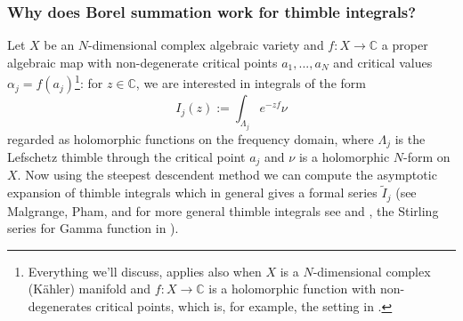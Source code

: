 \documentclass{article}
\theoremstyle{definition}
\newcommand{\C}{\mathbb{C}}
\theoremstyle{plain}
\begin{document}


\subsubsection{Why does Borel summation work for thimble integrals?}
Let $X$ be an $N$-dimensional complex algebraic variety and $f\colon X\to\C$ a proper algebraic map with non-degenerate critical points $a_1,...,a_N$ and critical values $\alpha_j=f(a_j)$\footnote{Everything we’ll discuss, applies also when $X$ is a $N$-dimensional complex (K\"ahler) manifold and $f\colon X\to\C$ is a holomorphic function with non-degenerates critical points, which is, for example, the setting in \cite{Witten}.}: for $z\in\C$, we are interested in integrals of the form 
\[
I_j(z):=\int_{\Lambda_j}e^{-zf}\nu
\]
regarded as holomorphic functions on the frequency domain, where $\Lambda_j$ is the Lefschetz thimble through the critical point $a_j$ and $\nu$ is a holomorphic $N$-form on $X$.
Now using the steepest descendent method we can compute the asymptotic expansion of thimble integrals which in general gives a formal series $\tilde{I}_j$ (see Malgrange, Pham, and for more general thimble integrals see \cite[Section 1.2.2]{mistegard_phdthesis} and \cite{andersen2020resurgence}, the Stirling series for Gamma function in \cite{Maxim_slide_ERC,Maxim_talk_2023}).
\end{document}
